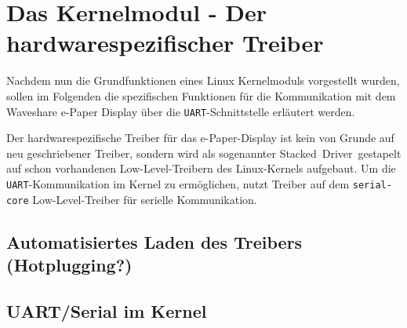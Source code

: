 
\chapter{Das Kernelmodul - Der hardwarespezifischer Treiber} %
Nachdem nun die Grundfunktionen eines Linux Kernelmoduls vorgestellt wurden, sollen im Folgenden die spezifischen Funktionen für die Kommunikation mit dem Waveshare e-Paper Display über die \texttt{UART}-Schnittstelle erläutert werden.

Der hardwarespezifische Treiber für das e-Paper-Display ist kein von Grunde auf neu geschriebener Treiber, sondern wird als sogenannter \glqq Stacked~Driver\grqq~gestapelt auf schon vorhandenen Low-Level-Treibern des Linux-Kernels aufgebaut. 
Um die \texttt{UART}-Kommunikation im Kernel zu ermöglichen, nutzt Treiber auf dem \texttt{serial-core} Low-Level-Treiber für serielle Kommunikation. 

\section{Automatisiertes Laden des Treibers (Hotplugging?)} %



\section{UART/Serial im Kernel} %



